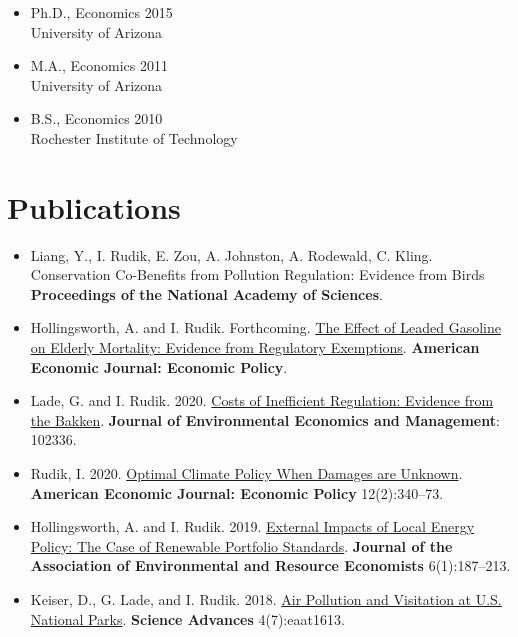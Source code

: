 \documentclass{res} %
\begin{document}
\begin{resume}

	\begin{itemize}
		\item[] Ph.D., Economics \hfill 2015\\
		University of Arizona

		\item[] M.A., Economics \hfill 2011\\
		University of Arizona

		\item[] B.S.,  Economics \hfill 2010\\
		Rochester Institute of Technology

	\end{itemize}
\vspace{-.075in}
\section{Publications}
\begin{itemize}
	\item[] Liang, Y., I. Rudik, E. Zou, A. Johnston, A. Rodewald, C. Kling. Conservation Co-Benefits from Pollution Regulation: Evidence from Birds \textbf{Proceedings of the National Academy of Sciences}.
	\item[] Hollingsworth, A. and I. Rudik. Forthcoming. \href{https://osf.io/preprints/socarxiv/rdy6g}{The Effect of Leaded Gasoline on Elderly Mortality: Evidence from Regulatory Exemptions}. \textbf{American Economic Journal: Economic Policy}.
	\item[] Lade, G. and I. Rudik. 2020. \href{https://papers.ssrn.com/sol3/papers.cfm?abstract_id=3086728}{Costs of Inefficient Regulation: Evidence from the Bakken}. \textbf{Journal of Environmental Economics and Management}: 102336.
	\item[] Rudik, I. 2020. \href{https://www.aeaweb.org/articles?id=10.1257/pol.20160541}{Optimal Climate Policy When Damages are Unknown}. \textbf{American Economic Journal: Economic Policy} 12(2):340--73. 
	\item[] Hollingsworth, A. and I. Rudik. 2019. \href{http://papers.ssrn.com/sol3/papers.cfm?abstract_id=2697222}{External Impacts of Local Energy Policy: The Case of Renewable Portfolio Standards}. \textbf{Journal of the Association of Environmental and Resource Economists} 6(1):187--213.
	\item[] Keiser, D., G. Lade, and I. Rudik. 2018. \href{http://advances.sciencemag.org/content/4/7/eaat1613}{Air Pollution and Visitation at U.S. National Parks}. \textbf{Science Advances} 4(7):eaat1613.

\end{itemize}
\end{resume}
\end{document}
